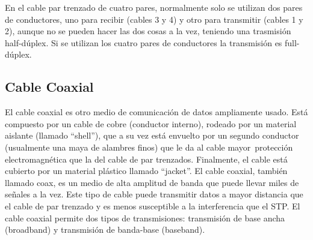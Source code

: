 \documentclass[a4paper]{article}
\begin{document}
En el cable par trenzado de cuatro pares, normalmente solo se utilizan
dos pares de conductores, uno para recibir (cables 3 y 4) y otro para
transmitir (cables 1 y 2), aunque no se pueden hacer las dos cosas a la
vez, teniendo una trasmisión half-dúplex. Si se utilizan los cuatro
pares de conductores la transmisión es full-dúplex.

\noindent{}

\subsection{Cable Coaxial}
El cable coaxial es otro medio de comunicación de datos ampliamente
usado. Está compuesto por un cable de cobre (conductor interno), rodeado
por un material aislante (llamado ``shell''), que a su vez está envuelto
por un segundo conductor (usualmente una maya de alambres finos) que le
da al cable mayor~protección electromagnética que la del cable de par
trenzados. Finalmente, el cable está cubierto por un material plástico
llamado ``jacket''. El cable coaxial, también llamado coax, es un medio
de alta amplitud de banda que puede llevar miles de señales a la vez.
Este tipo de cable puede transmitir datos a mayor distancia que el cable
de par trenzado y es menos susceptible a la interferencia que el STP. El
cable coaxial permite dos tipos de transmisiones: transmisión de base
ancha (broadband) y transmisión de banda-base (baseband).
\end{document}
